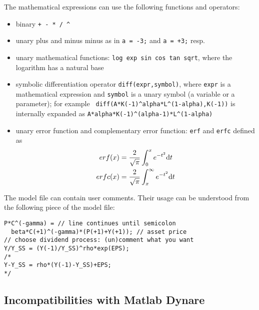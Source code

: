 \documentclass[10pt]{article}
\begin{document}
The mathematical expressions can use the following functions and operators:
\begin{itemize}
\item binary {\tt + - * / \verb|^|}
\item unary plus and minus minus as in {\tt a = -3;} and {\tt a = +3;} resp.
\item unary mathematical functions: {\tt log exp sin cos tan
sqrt}, whe\-re the logarithm has a natural base
\item symbolic differentiation operator {\tt diff(expr,symbol)}, where
{\tt expr} is a mathematical expression and {\tt symbol} is a unary
symbol (a variable or a parameter); for example {\tt
  diff(A*K(-1)\verb|^|alpha*L\verb|^|(1-alpha),K(-1))} is internally expanded as
{\tt A*alpha*K(-1)\verb|^|(alpha-1)*L\verb|^|(1-alpha)}
\item unary error function and complementary error function: {\tt erf}
and {\tt erfc} defined as
\begin{eqnarray*}
erf(x) &= \frac{2}{\sqrt{\pi}}\int_0^x e^{-t^2}{\rm d}t\\
erfc(x)&= \frac{2}{\sqrt{\pi}}\int_x^\infty e^{-t^2}{\rm d}t
\end{eqnarray*}
\end{itemize}

The model file can contain user comments. Their usage can be
understood from the following piece of the model file:

{\small
\begin{verbatim}
P*C^(-gamma) = // line continues until semicolon
  beta*C(+1)^(-gamma)*(P(+1)+Y(+1)); // asset price
// choose dividend process: (un)comment what you want
Y/Y_SS = (Y(-1)/Y_SS)^rho*exp(EPS);
/*
Y-Y_SS = rho*(Y(-1)-Y_SS)+EPS;
*/
\end{verbatim}
}

\subsection{Incompatibilities with Matlab Dynare}
\end{document}
